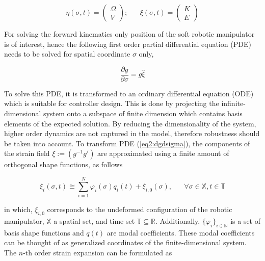 \begin{equation}
    \eta(\sigma,t) = \begin{pmatrix} \Omega \\ V \end{pmatrix}; \hspace{20pt} \xi(\sigma,t) = \begin{pmatrix} K \\ E \end{pmatrix}
    \label{eq2:etaxi}
\end{equation}

For solving the forward kinematics only position of the soft robotic manipulator is of interest, hence the following first order partial differential equation (PDE) needs to be solved for spatial coordinate $\sigma$ only,

\begin{equation}
    \frac{\partial g}{\partial \sigma} = g \hat{\xi}
    \label{eq2:dgdsigma}
\end{equation}

To solve this PDE, it is transformed to an ordinary differential equation (ODE) which is suitable for controller design. This is done by projecting the infinite-dimensional system onto a subspace of finite dimension which contains basis elements of the expected solution. By reducing the dimensionality of the system, higher order dynamics are not captured in the model, therefore robustness should be taken into account. To transform PDE (\ref{eq2:dgdsigma}), the components of the strain field $\xi := (g^{-1}g')$ are approximated using a finite amount of orthogonal shape functions, as follows

\begin{equation}
    \xi_i(\sigma,t) \cong \sum_{i=1}^N \varphi_i(\sigma)q_i(t) + \xi_{i,0}(\sigma), \hspace{20pt} \forall \sigma \in \mathbb{X}, t \in \mathbb{T}
\end{equation}

in which, $\xi_{i,0}$ corresponds to the undeformed configuration of the robotic manipulator, $\mathbb{X}$ a spatial set, and time set $\mathbb{T} \subseteq \mathbb{R}$. Additionally, $\{\varphi_i\}_{i \in \mathbb{N}}$ is a set of basis shape functions and $q(t)$ are modal coefficients. These modal coefficients can be thought of as generalized coordinates of the finite-dimensional system. The $n$-th order strain expansion can be formulated as


